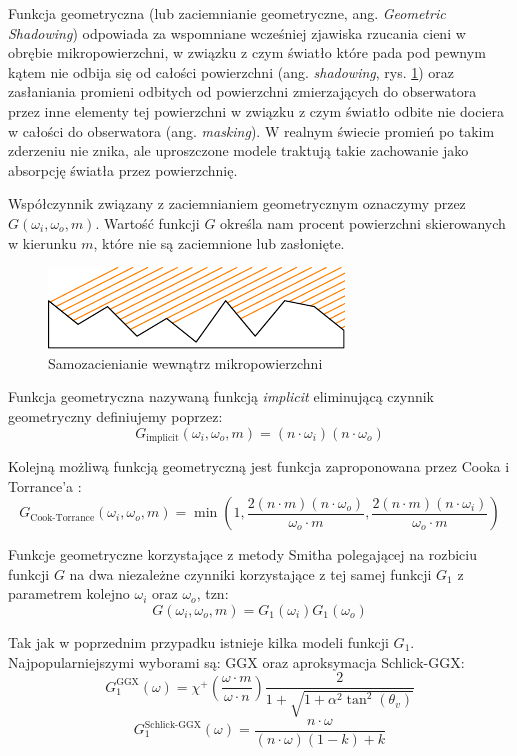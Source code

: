 \documentclass[../main.tex]{subfiles}
\begin{document}
Funkcja geometryczna (lub zaciemnianie geometryczne, ang. \textit{Geometric
Shadowing}) odpowiada za wspomniane wcześniej zjawiska rzucania cieni w obrębie
mikropowierzchni, w związku z czym światło które pada pod pewnym kątem nie
odbija się od całości powierzchni (ang. \textit{shadowing}, rys.
\ref{fig:GeometricShadowing}) oraz zasłaniania promieni odbitych od powierzchni
zmierzających do obserwatora przez inne elementy tej powierzchni w związku z
czym światło odbite nie dociera w całości do obserwatora (ang.
\textit{masking}). W realnym świecie promień po takim zderzeniu nie znika, ale
uproszczone modele traktują takie zachowanie jako absorpcję światła przez
powierzchnię.

Współczynnik związany z zaciemnianiem geometrycznym oznaczymy przez $G(\omega_i,\omega_o,m)$.
Wartość funkcji $G$ określa nam procent powierzchni skierowanych w kierunku
$m$, które nie są zaciemnione lub zasłonięte.

\begin{figure}[h]
  \centering
  \includegraphics{illustrations/pbr/geometry_shadowing.pdf}
  \vspace{0.25cm}
  \caption{Samozacienianie wewnątrz mikropowierzchni}
  \label{fig:GeometricShadowing}
\end{figure}

Funkcja geometryczna nazywaną funkcją \textit{implicit} eliminującą czynnik geometryczny definiujemy poprzez:
\[
  G_{\text{implicit}}(\omega_i, \omega_o, m) =
    (n \cdot \omega_i) (n \cdot \omega_o)
\]

Kolejną możliwą funkcją geometryczną jest funkcja zaproponowana przez Cooka i Torrance'a \cite{CookTorrance}:
\[
  G_{\text{Cook-Torrance}}(\omega_i,\omega_o,m) =
    \min \left(
      1,
      \frac{2(n \cdot m)(n \cdot \omega_o)}{
        \omega_o \cdot m
      },
      \frac{2(n \cdot m)(n \cdot \omega_i)}{
        \omega_o \cdot m
      }
    \right)
\]

Funkcje geometryczne korzystające z metody Smitha polegającej na rozbiciu
funkcji $G$ na dwa niezależne czynniki korzystające z tej samej funkcji $G_1$
z parametrem kolejno $\omega_i$ oraz $\omega_o$, tzn:
\[
  G(\omega_i, \omega_o, m) = G_1(\omega_i) G_1(\omega_o)
\]

Tak jak w poprzednim przypadku istnieje kilka modeli funkcji $G_1$.
Najpopularniejszymi wyborami są: GGX \cite{WalterMicrofacetModels} oraz aproksymacja Schlick-GGX:
\[
  G_{1}^{\text{GGX}}(\omega) =
    \chi^{+}\left(\frac{\omega \cdot m}{\omega \cdot n}\right)
    \frac{2}{
      1 + \sqrt{
        1 + \alpha^2 \tan^{2}\left(\theta_v\right)
      }
    }
\]
\[
  G_{1}^{\text{Schlick-GGX}}(\omega) =
    \frac{n \cdot \omega}{
      (n \cdot \omega)(1 - k) + k
    }
\]
\end{document}
